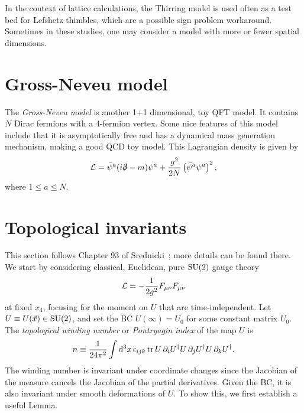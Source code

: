 In the context of lattice calculations, the Thirring model is used often as a
test bed for Lefshetz thimbles, which are a possible sign problem workaround.
Sometimes in these studies, one may consider a model with more or fewer spatial
dimensions.

\section{Gross-Neveu model}\label{sec:GNmodel}

The {\it Gross-Neveu model} \cite{gross_dynamical_1974} is another
1+1 dimensional, toy QFT model. It contains $N$ Dirac fermions with a
4-fermion vertex. Some nice features of this model include that it is
asymptotically free and has a dynamical mass generation mechanism, making
a good QCD toy model. This Lagrangian density is given by
\begin{equation}
\mathcal{L}=\bar{\psi}^a(i \slashed\partial-m) \psi^a+\frac{g^2}{2
N}\left(\bar{\psi}^a \psi^a\right)^2,
\end{equation}
where $1\leq a\leq N$.

\section{Topological invariants}\label{sec:topinvar}

This section follows Chapter 93 of Srednicki~\cite{srednicki_quantum_2007};
more details can be found there.
We start by considering classical, Euclidean, pure $\operatorname{SU}(2)$ gauge theory
\begin{equation}\label{eq:topaction}
  \mathcal{L}=-\frac{1}{2g^2}F_{\mu\nu}F_{\mu\nu}
\end{equation}
at fixed $x_4$, focusing for the moment on $U$ that are time-independent.
Let $U\equiv U(\vec{x})\in\operatorname{SU}(2)$, and set the BC $U(\infty)=U_0$
for some constant matrix $U_0$.
The {\it topological winding number}
or {\it Pontryagin index} of the map $U$ is
\begin{equation}\label{eq:wn}
  n\equiv\frac{1}{24\pi^2}\int\dd[3]{x}\epsilon_{ijk}
    \tr U\,\partial_iU^\dagger U\,\partial_jU^\dagger
        U\,\partial_kU^\dagger.
\end{equation}
The winding number is invariant under coordinate changes since the Jacobian of
the measure cancels the Jacobian of the partial derivatives.
Given the BC, it is also invariant under smooth deformations of $U$.
To show this, we first establish a useful Lemma.

